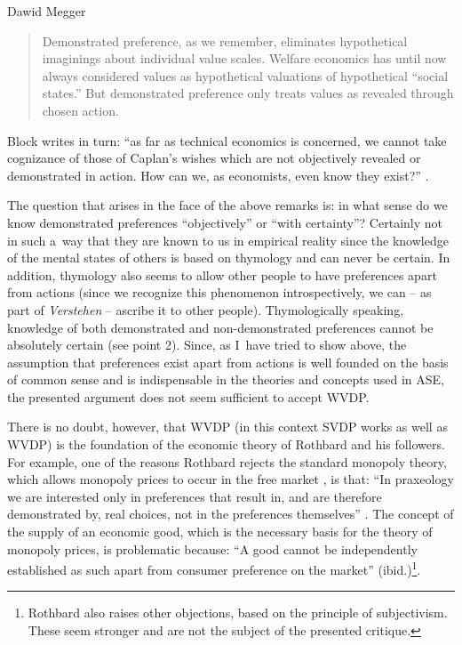 \begin{artengenv}{Dawid Megger}
\begin{quote}
Demonstrated preference, as we remember, eliminates hypothetical imaginings about individual value scales. Welfare economics has until now always considered values as hypothetical valuations of hypothetical ``social states.'' But demonstrated preference only treats values as revealed through chosen action. 
\parencite[][p.320]{rothbard_present_2011}%
\end{quote}




Block writes in turn: ``as far as technical economics is concerned, we cannot take cognizance of those of Caplan's wishes which are not objectively revealed or demonstrated in action. How can we, as economists, even know they exist?'' 
\parencite[][p.23]{block_austrian_1999}.%




The question that arises in the face of the above remarks is: in what sense do we know demonstrated preferences ``objectively'' or ``with certainty''? Certainly not in such a~way that they are known to us in empirical reality since the knowledge of the mental states of others is based on thymology and can never be certain. In addition, thymology also seems to allow other people to have preferences apart from actions (since we recognize this phenomenon introspectively, we can -- as part of \textit{Verstehen} -- ascribe it to other people). Thymologically speaking, knowledge of both demonstrated and non-demonstrated preferences cannot be absolutely certain (see point 2). Since, as I~have tried to show above, the assumption that preferences exist apart from actions is well founded on the basis of common sense and is indispensable in the theories and concepts used in ASE, the presented argument does not seem sufficient to accept WVDP.



There is no doubt, however, that WVDP (in this context SVDP works as well as WVDP) is the foundation of the economic theory of Rothbard and his followers. For example, one of the reasons Rothbard rejects the standard monopoly theory, which allows monopoly prices to occur in the free market 
\parencite[see:][]{mises_human_1998}, %
 is that: ``In praxeology we are interested only in preferences that result in, and are therefore demonstrated by, real choices, not in the preferences themselves'' 
\parencite[][p.701]{rothbard_man_2009}. %
 The concept of the supply of an economic good, which is the necessary basis for the theory of monopoly prices, is problematic because: ``A good cannot be independently established as such apart from consumer preference on the market'' (ibid.)\footnote{Rothbard also raises other objections, based on the principle of subjectivism. These seem stronger and are not the subject of the presented critique.}.




\end{artengenv}
